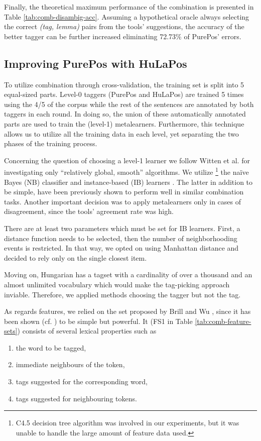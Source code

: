 Finally, the theoretical maximum performance of the combination is presented in Table \ref{tab:comb-disambig-acc}.
Assuming a hypothetical oracle always selecting the correct \emph{(tag, lemma)} pairs from the tools' suggestions, the accuracy of the better tagger can be further increased eliminating 72.73\% of PurePos' errors. 

\subsection{Improving PurePos with HuLaPos}

To utilize combination through cross-validation, the training set is split into 5 equal-sized parts.
Level-0 taggers (PurePos and HuLaPos) are trained 5 times using the 4/5 of the corpus while the rest of the sentences are annotated by both taggers in each round.
In doing so, the union of these automatically annotated parts are used to train the (level-1) metalearners.
Furthermore, this technique allows us to utilize all the training data in each level, yet separating the two phases of the training process. 

Concerning the question of choosing a level-1 learner we follow Witten et al. \cite{Witten2011} for investigating only ``relatively global, smooth'' algorithms.
We utilize \footnote{C4.5 decision tree algorithm was involved in our experiments, but it was unable to handle the large amount of feature data used.} the naïve Bayes (NB) classifier \cite{John1995} and instance-based (IB) learners \cite{Aha1991}.
The latter in addition to be simple, have been previously shown to perform well in similar combination tasks.
Another important decision was to apply metalearners only in cases of disagreement, since the tools’ agreement rate was high.

There are at least two parameters which must be set for IB learners.
First, a distance function needs to be selected, then the number of neighborhooding events is restricted.
In that way, we opted on using Manhattan distance and decided to rely only on the single closest item. 

Moving on, Hungarian has a tagset with a cardinality of over a thousand and an almost unlimited vocabulary which would make the tag-picking approach inviable. Therefore, we applied methods choosing the tagger but not the tag. 

As regards features, we relied on the set proposed by Brill and Wu \cite{Brill1998}, since it has been shown (cf. \cite{Halteren2001}) to be simple but powerful. It (FS1 in Table \ref{tab:comb-feature-sets}) consists of several lexical properties such as
\begin{enumerate}
 \item the word to be tagged, 
 \item immediate neighbours of the token,
 \item tags suggested for the corresponding word,
 \item tags suggested for neighbouring tokens.
\end{enumerate}

